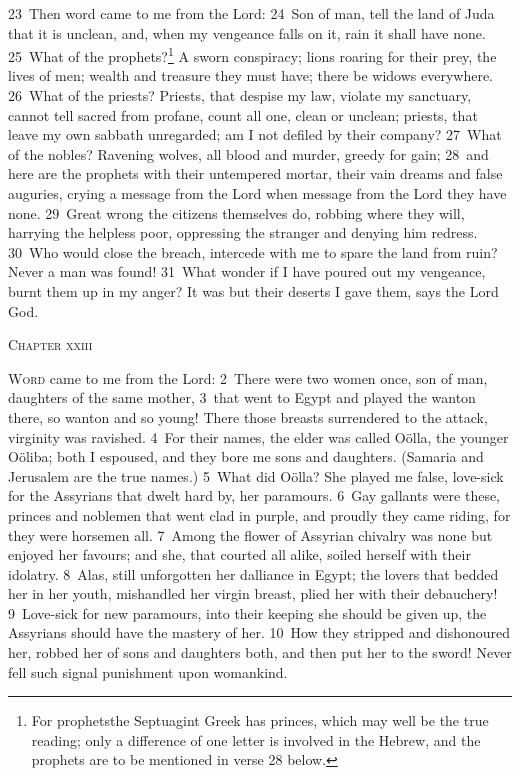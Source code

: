 \documentclass[10pt]{book} %
\begin{document}
\textcolor{benred8}{23}~Then word came to me from the Lord: \textcolor{benred8}{24}~Son of man, tell the land of Juda that it is unclean, and, when my vengeance falls on it, rain it shall have none. \textcolor{benred8}{25}~What of the prophets?\footnote[1]{For \textasciigrave prophets\textquotesingle  the Septuagint Greek has \textasciigrave princes\textquotesingle , which may well be the true reading; only a difference of one letter is involved in the Hebrew, and the prophets are to be mentioned in verse 28 below.} A sworn conspiracy; lions roaring for their prey, the lives of men; wealth and treasure they must have; there be widows everywhere. \textcolor{benred8}{26}~What of the priests? Priests, that despise my law, violate my sanctuary, cannot tell sacred from profane, count all one, clean or unclean; priests, that leave my own sabbath unregarded; am I not defiled by their company? \textcolor{benred8}{27}~What of the nobles? Ravening wolves, all blood and murder, greedy for gain; \textcolor{benred8}{28}~and here are the prophets with their untempered mortar, their vain dreams and false auguries, crying a message from the Lord when message from the Lord they have none. \textcolor{benred8}{29}~Great wrong the citizens themselves do, robbing where they will, harrying the helpless poor, oppressing the stranger and denying him redress. \textcolor{benred8}{30}~Who would close the breach, intercede with me to spare the land from ruin? Never a man was found! \textcolor{benred8}{31}~What wonder if I have poured out my vengeance, burnt them up in my anger? It was but their deserts I gave them, says the Lord God.
\begin{large}\begin{center}\textsc{Chapter xxiii}\end{center}\end{large}
\lettrine[lines=2]{W}{ord} came to me from the Lord: \textcolor{benred8}{2}~There were two women once, son of man, daughters of the same mother, \textcolor{benred8}{3}~that went to Egypt and played the wanton there, so wanton and so young! There those breasts surrendered to the attack, virginity was ravished. \textcolor{benred8}{4}~For their names, the elder was called O\"{o}lla, the younger O\"{o}liba; both I espoused, and they bore me sons and daughters. (Samaria and Jerusalem are the true names.)
\textcolor{benred8}{5}~What did O\"{o}lla? She played me false, love-sick for the Assyrians that dwelt hard by, her paramours. \textcolor{benred8}{6}~Gay gallants were these, princes and noblemen that went clad in purple, and proudly they came riding, for they were horsemen all. \textcolor{benred8}{7}~Among the flower of Assyrian chivalry was none but enjoyed her favours; and she, that courted all alike, soiled herself with their idolatry. \textcolor{benred8}{8}~Alas, still unforgotten her dalliance in Egypt; the lovers that bedded her in her youth, mishandled her virgin breast, plied her with their debauchery! \textcolor{benred8}{9}~Love-sick for new paramours, into their keeping she should be given up, the Assyrians should have the mastery of her. \textcolor{benred8}{10}~How they stripped and dishonoured her, robbed her of sons and daughters both, and then put her to the sword! Never fell such signal punishment upon womankind.
\end{document}
